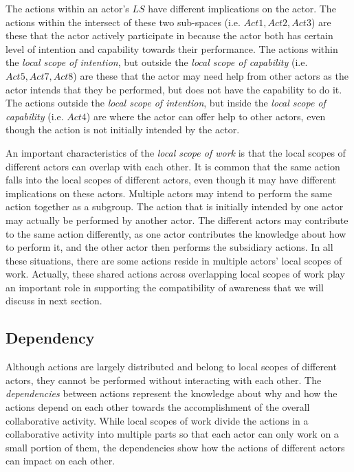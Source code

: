 The actions within an actor's $LS$ have different implications on the actor. The actions within the intersect of these two sub-spaces (i.e. $Act1,Act2,Act3$) are these that the actor actively participate in because the actor both has certain level of intention and capability towards their performance. The actions within the \emph{local scope of intention}, but outside the \emph{local scope of capability} (i.e. $Act5,Act7,Act8$) are these that the actor may need help from other actors as the actor intends that they be performed, but does not have the capability to do it. The actions outside the \emph{local scope of intention}, but inside the \emph{local scope of capability} (i.e. $Act4$) are where the actor can offer help to other actors, even though the action is not initially intended by the actor.

An important characteristics of the \emph{local scope of work} is that the local scopes of different actors can overlap with each other. It is common that the same action falls into the local scopes of different actors, even though it may have different implications on these actors. Multiple actors may intend to perform the same action together as a subgroup. The action that is initially intended by one actor may actually be performed by another actor. The different actors may contribute to the same action differently, as one actor contributes the knowledge about how to perform it, and the other actor then performs the subsidiary actions. In all these situations, there are some actions reside in multiple actors' local scopes of work. Actually, these shared actions across overlapping local scopes of work play an important role in supporting the compatibility of awareness that we will discuss in next section.

\subsection{Dependency} %
\label{sub:dependency}
Although actions are largely distributed and belong to local scopes of different actors, they cannot be performed without interacting with each other. The \emph{dependencies} between actions represent the knowledge about why and how the actions depend on each other towards the accomplishment of the overall collaborative activity. While local scopes of work divide the actions in a collaborative activity into multiple parts so that each actor can only work on a small portion of them, the dependencies show how the actions of different actors can impact on each other.


